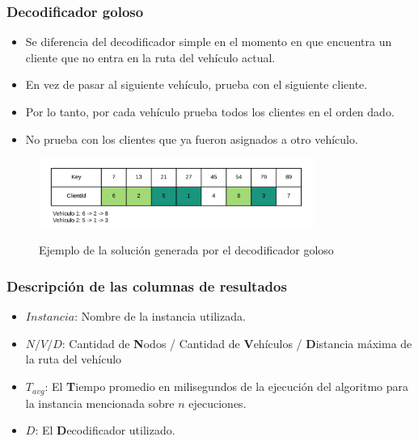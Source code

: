 \documentclass{beamer}
\begin{document}
\begin{frame}
\frametitle{Decodificador goloso}

\begin{itemize}
    \item Se diferencia del decodificador simple en el momento en que encuentra un cliente que no entra en la ruta del vehículo actual.
    \pause
    \item En vez de pasar al siguiente vehículo, prueba con el siguiente cliente.
    \pause
    \item Por lo tanto, por cada vehículo prueba todos los clientes en el orden dado.
    \pause
    \item No prueba con los clientes que ya fueron asignados a otro vehículo.
    \pause
\end{itemize}

\begin{figure}[h]
	\caption{Ejemplo de la solución generada por el decodificador goloso}
	\centering
	\includegraphics[width=9cm]{DistribucionClientesDecoGoloso}
	\label{fig:DistribucionClientesDecoGoloso}
\end{figure}

\end{frame}


\begin{frame}
\frametitle{Descripción de las columnas de resultados}

\begin{itemize}
	\item \textbf{$Instancia$}: Nombre de la instancia utilizada.
	\item \textbf{$N/V/D$}: Cantidad de \textbf{N}odos / Cantidad de \textbf{V}ehículos / \textbf{D}istancia máxima de la ruta del vehículo
	\item \textbf{$T_{avg}$}: El \textbf{T}iempo promedio en milisegundos de la ejecución del algoritmo para la instancia mencionada sobre $n$ ejecuciones.
	\item \textbf{$D$}: El \textbf{D}ecodificador utilizado.
\end{itemize}

\end{frame}
\end{document}
